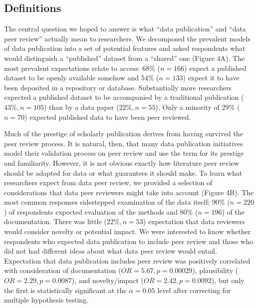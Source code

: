 \documentclass[10pt]{article}
\begin{document}
\subsection*{Definitions}

The central question we hoped to answer is what ``data publication'' and ``data peer review'' actually mean to researchers.
We decomposed the prevalent models of data publication into a set of potential features and asked respondents what would distinguish a ``published'' dataset from a ``shared'' one (Figure 4A).
The most prevalent expectations relate to access: 68\% ($n=166$) expect a published dataset to be openly available somehow and 54\% ($n=133$) expect it to have been deposited in a repository or database.
Substantially more researchers expected a published dataset to be accompanied by a traditional publication ($43\%, n=105$) than by a data paper ($22\%, n=55$).
Only a minority of 29\% ($n=70$) expected published data to have been peer reviewed.

Much of the prestige of scholarly publication derives from having survived the peer review process.
It is natural, then, that many data publication initiatives model their validation process on peer review and use the term for its prestige and familiarity.
However, it is not obvious exactly how literature peer review should be adapted for data or what guarantees it should make.
To learn what researchers expect from data peer review, we provided a selection of considerations that data peer reviewers might take into account (Figure 4B).
The most common responses sidestepped examination of the data itself; 90\% ($n=220$) of respondents expected evaluation of the methods and 80\% ($n=196$) of the documentation.
There was little ($22\%, n=53$) expectation that data reviewers would consider novelty or potential impact.
We were interested to know whether respondents who expected data publication to include peer review and those who did not had different ideas about what data peer review would entail.  
Expectation that data publication includes peer review was positively correlated with consideration of documentation ($OR= 5.67, p=0.00029$), plausibility ($OR= 2.29, p=0.0087$), and novelty/impact ($OR= 2.42, p= 0.0092$), but only the first is statistically significant at the $\alpha= 0.05$ level after correcting for multiple hypothesis testing.
\end{document}
